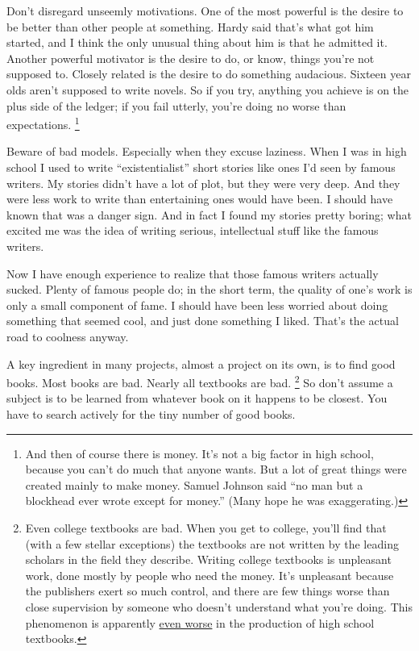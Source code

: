 \documentclass[12pt]{book}
\begin{document}
Don't disregard unseemly motivations. One of the most powerful is the
desire to be better than other people at something. Hardy said that's
what got him started, and I think the only unusual thing about him is
that he admitted it. Another powerful motivator is the desire to do, or
know, things you're not supposed to. Closely related is the desire to do
something audacious. Sixteen year olds aren't supposed to write novels.
So if you try, anything you achieve is on the plus side of the ledger;
if you fail utterly, you're doing no worse than expectations. \footnote{And then of course there is money. It's not a big factor in high
school, because you can't do much that anyone wants. But a lot of great
things were created mainly to make money. Samuel Johnson said ``no man
but a blockhead ever wrote except for money.'' (Many hope he was
exaggerating.)}

Beware of bad models. Especially when they excuse laziness. When I was
in high school I used to write ``existentialist'' short stories like
ones I'd seen by famous writers. My stories didn't have a lot of plot,
but they were very deep. And they were less work to write than
entertaining ones would have been. I should have known that was a danger
sign. And in fact I found my stories pretty boring; what excited me was
the idea of writing serious, intellectual stuff like the famous writers.

Now I have enough experience to realize that those famous writers
actually sucked. Plenty of famous people do; in the short term, the
quality of one's work is only a small component of fame. I should have
been less worried about doing something that seemed cool, and just done
something I liked. That's the actual road to coolness anyway.

A key ingredient in many projects, almost a project on its own, is to
find good books. Most books are bad. Nearly all textbooks are bad.
\footnote{Even college textbooks are bad. When you get to college, you'll
find that (with a few stellar exceptions) the textbooks are not written
by the leading scholars in the field they describe. Writing college
textbooks is unpleasant work, done mostly by people who need the money.
It's unpleasant because the publishers exert so much control, and there
are few things worse than close supervision by someone who doesn't
understand what you're doing. This phenomenon is apparently
\href{http://www.edutopia.org/muddle-machine}{even worse} in the
production of high school textbooks.} So don't assume a subject is to be learned from whatever book on
it happens to be closest. You have to search actively for the tiny
number of good books.
\end{document}
